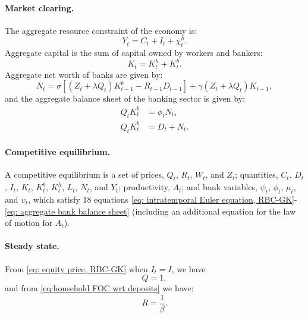 \documentclass[12pt,english]{extarticle}
\begin{document}
	\paragraph{Market clearing.} 
	The aggregate resource constraint of the economy is:
	\begin{equation}
		\label{eq: aggregate resource constraint RBC-GK}
		Y_t = C_t + I_t + \chi_t^h.
	\end{equation}
	Aggregate capital is the sum of capital owned by workers and bankers:
	\begin{equation}
		\label{eq: sum of capital}
		K_t = K_t^h + K_t^b.
	\end{equation}
	Aggregate net worth of banks are given by:
	\begin{equation}
		\label{eq: aggregate net worth}
		N_t = \sigma\left[(Z_t + \lambda Q_t)K_{t-1}^b - R_{t-1}D_{t-1}\right] + \gamma(Z_t + \lambda Q_t)K_{t-1},
	\end{equation}
	and the aggregate balance sheet of the banking sector is given by:
	\begin{align}
		\label{eq: aggregate leverage rate}
		Q_tK_t^b &= \phi_t N_t, \\
		\label{eq: aggregate bank balance sheet}
		Q_tK_t^b &= D_t + N_t.
	\end{align}
	
	\paragraph{Competitive equilibrium.} A competitive equilibrium is a set of prices, $Q_t$, $R_t$, $W_t$, and $Z_t$; quantities, $C_t$, $D_t$, $I_t$, $K_t$, $K_t^b$, $K_t^h$, $L_t$, $N_t$, and $Y_t$; productivity, $A_t$; and bank variables, $\psi_t$, $\phi_t$, $\mu_t$, and $\upsilon_t$, which satisfy 18 equations \eqref{eq: intratemporal Euler equation, RBC-GK}-\eqref{eq: aggregate bank balance sheet} (including an additional equation for the law of motion for $A_t$).
	
	\paragraph{Steady state.} From \eqref{eq: equity price, RBC-GK} when $I_t = I$, we have
	\begin{equation*}
		Q = 1,
	\end{equation*}
	and from \eqref{eq:household FOC wrt deposits} we have:
	\begin{equation*}
		R = \frac{1}{\beta}.
	\end{equation*}
	
\end{document}
